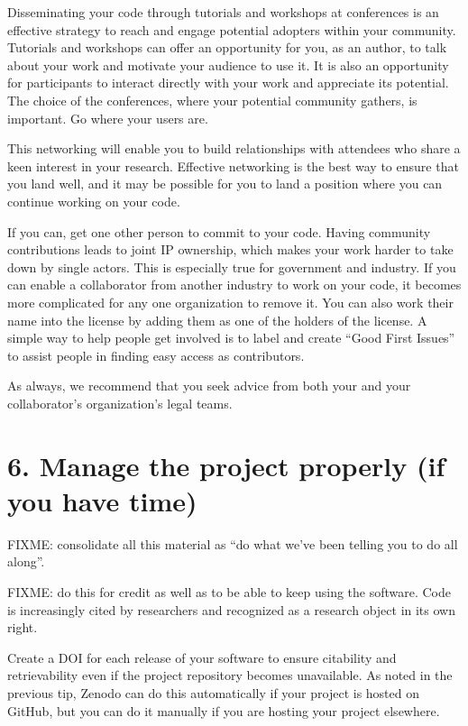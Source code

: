 \documentclass[10pt,letterpaper]{article}
\begin{document}
Disseminating your code through tutorials and workshops at conferences
is an effective strategy to reach and engage potential adopters within your community.
Tutorials and workshops can offer an opportunity for you,
as an author,
to talk about your work and motivate your audience to use it.
It is also an opportunity for participants to interact directly with your work and appreciate its potential.
The choice of the conferences, where your potential community gathers, is important.
Go where your users are.

This networking will enable you to build relationships with attendees who share a keen interest in your research.
Effective networking is the best way to ensure that you land well,
and it may be possible for you to land a position where you can continue working on your code.

If you can, get one other person to commit to your code.
Having community contributions leads to joint IP ownership,
which makes your work harder to take down by single actors.
This is especially true for government and industry.
If you can enable a collaborator from another industry to work on your code,
it becomes more complicated for any one organization to remove it.
You can also work their name into the license
by adding them as one of the holders of the license.
A simple way to help people get involved is to label and create ``Good First Issues''
to assist people in finding easy access as contributors.

As always,
we recommend that you seek advice from both your and your collaborator's organization's legal teams.

\section*{6. Manage the project properly (if you have time)}

FIXME: consolidate all this material as ``do what we've been telling you to do all along''.

FIXME: do this for credit as well as to be able to keep using the software.
Code is increasingly cited by researchers \cite{Smith2016,Katz2021,Garijo2024}
and recognized as a research object in its own right.

Create a DOI for each release of your software
to ensure citability and retrievability even if the project repository becomes unavailable.
As noted in the previous tip,
Zenodo can do this automatically if your project is hosted on GitHub,
but you can do it manually if you are hosting your project elsewhere.
\end{document}
